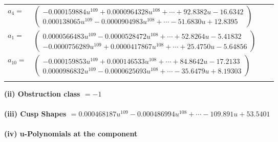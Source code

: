 \documentclass[1p]{elsarticle_modified}
\theoremstyle{definition}
\begin{document}
\begin{tabular}{m{7pt} m{180pt} m{7pt} m{180pt} }
\flushright $a_{4}=$&$\begin{pmatrix}-0.000159884 u^{109}+0.0000964328 u^{108}+\cdots+92.8382 u-16.6342\\0.000138065 u^{109}-0.0000904983 u^{108}+\cdots-51.6830 u+12.8395\end{pmatrix}$ \\
\flushright $a_{1}=$&$\begin{pmatrix}0.0000566483 u^{109}-0.0000528472 u^{108}+\cdots+52.8264 u-5.41832\\-0.0000756289 u^{109}+0.0000417867 u^{108}+\cdots+25.4750 u-5.64856\end{pmatrix}$ \\
\flushright $a_{10}=$&$\begin{pmatrix}-0.000159853 u^{109}+0.000146533 u^{108}+\cdots+84.8642 u-17.2133\\0.0000986832 u^{109}-0.0000625693 u^{108}+\cdots-35.6479 u+8.19303\end{pmatrix}$\\&\end{tabular}
\flushleft \textbf{(ii) Obstruction class $= -1$}\\~\\
\flushleft \textbf{(iii) Cusp Shapes $= 0.000468187 u^{109}-0.000486994 u^{108}+\cdots-109.891 u+53.5401$}\\~\\
\newpage\renewcommand{\arraystretch}{1}
\flushleft \textbf{(iv) u-Polynomials at the component}\newline \\
\end{document}
